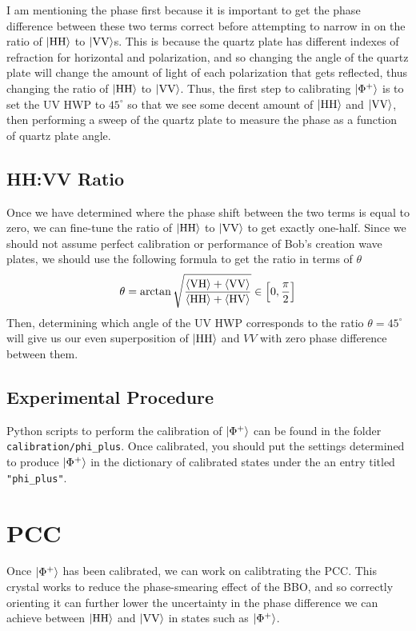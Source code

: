 \documentclass{paper}[11pt]
\begin{document}
	I am mentioning the phase first because it is important to get the phase difference between these two terms correct before attempting to narrow in on the ratio of $\ket{\text{HH}}$ to $\ket{\text{VV}}$s. This is because the quartz plate has different indexes of refraction for horizontal and polarization, and so changing the angle of the quartz plate will change the amount of light of each polarization that gets reflected, thus changing the ratio of $\ket{\text{HH}}$ to $\ket{\text{VV}}$. Thus, the first step to calibrating $\ket{\Phi^+}$ is to set the UV HWP to $45^\circ$ so that we see some decent amount of $\ket{\text{HH}}$ and $\ket{\text{VV}}$, then performing a sweep of the quartz plate to measure the phase as a function of quartz plate angle.
	
	\subsection{HH:VV Ratio}
	Once we have determined where the phase shift between the two terms is equal to zero, we can fine-tune the ratio of $\ket{\text{HH}}$ to $\ket{\text{VV}}$ to get exactly one-half. Since we should not assume perfect calibration or performance of Bob's creation wave plates, we should use the following formula to get the ratio in terms of $\theta$
	\begin{equation}
		\theta = \arctan\sqrt{\frac{{\langle{\text{VH}}\rangle}+{\langle{\text{VV}}\rangle}}{{\langle{\text{HH}}\rangle}+{\langle{\text{HV}}\rangle}}} \in \left[0,\frac{\pi}{2}\right]
	\end{equation}
	Then, determining which angle of the UV HWP corresponds to the ratio $\theta=45^\circ$ will give us our even superposition of $\ket{\text{HH}}$ and $VV$ with zero phase difference between them.
	
	\subsection{Experimental Procedure}
	Python scripts to perform the calibration of $\ket{\Phi^+}$ can be found in the folder \texttt{calibration/phi\_plus}. Once calibrated, you should put the settings determined to produce $\ket{\Phi^+}$ in the dictionary of calibrated states under the an entry titled \texttt{"phi\_plus"}.
	
	\section{PCC}
	Once $\ket{\Phi^+}$ has been calibrated, we can work on calibtrating the PCC. This crystal works to reduce the phase-smearing effect of the BBO, and so correctly orienting it can further lower the uncertainty in the phase difference we can achieve between $\ket{\text{HH}}$ and $\ket{\text{VV}}$ in states such as $\ket{\Phi^+}$.
	
\end{document}
